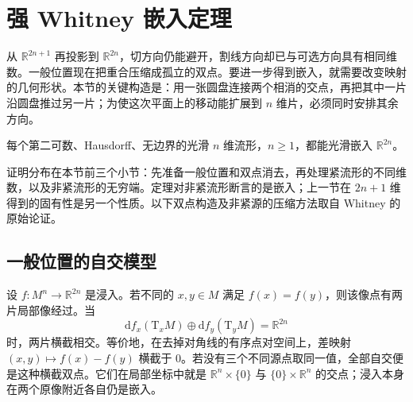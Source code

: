 % 
% 

\section{强 Whitney 嵌入定理}
\label{g2:sec:1502}

从 \(\mathbb R^{2n+1}\) 再投影到 \(\mathbb R^{2n}\)，切方向仍能避开，割线方向却已与可选方向具有相同维数。一般位置现在把重合压缩成孤立的双点。要进一步得到嵌入，就需要改变映射的几何形状。本节的关键构造是：用一张圆盘连接两个相消的交点，再把其中一片沿圆盘推过另一片；为使这次平面上的移动能扩展到 \(n\) 维片，必须同时安排其余方向。

\begin{theorem}\label{g2:thm:strong-whitney-embedding}
	每个第二可数、Hausdorff、无边界的光滑 \(n\) 维流形，\(n\ge1\)，都能光滑嵌入 \(\mathbb R^{2n}\)。
\end{theorem}

证明分布在本节前三个小节：先准备一般位置和双点消去，再处理紧流形的不同维数，以及非紧流形的无穷端。定理对非紧流形断言的是嵌入；上一节在 \(2n+1\) 维得到的固有性是另一个性质。以下双点构造及非紧源的压缩方法取自 Whitney 的原始论证\cite[第222--224、235--241页]{Whitney1944SelfIntersections}。

\subsection{一般位置的自交模型}
\label{g2:subsec:1502:01}

设 \(f:M^n\to\mathbb R^{2n}\) 是浸入。若不同的 \(x,y\in M\) 满足 \(f(x)=f(y)\)，则该像点有两片局部像经过。当
\[
	\mathrm{d}f_x(\mathrm{T}_xM)\oplus\mathrm{d}f_y(\mathrm{T}_yM)=\mathbb R^{2n}
\]
时，两片横截相交。等价地，在去掉对角线的有序点对空间上，差映射 \((x,y)\mapsto f(x)-f(y)\) 横截于 \(0\)。若没有三个不同源点取同一值，全部自交便是这种横截双点。它们在局部坐标中就是 \(\mathbb R^n\times\{0\}\) 与 \(\{0\}\times\mathbb R^n\) 的交点；浸入本身在两个原像附近各自仍是嵌入。

